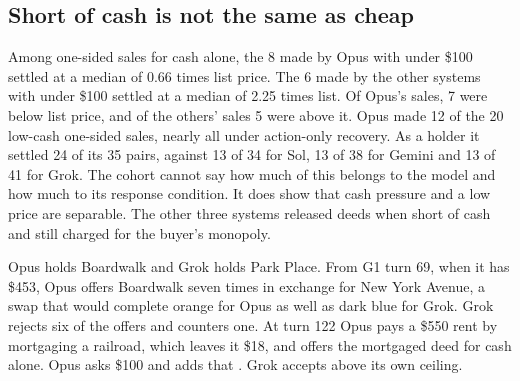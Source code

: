 \subsection{Short of cash is not the same as cheap}

Among one-sided sales for cash alone, the 8 made by Opus with under \$100 settled at a median of 0.66 times list price. The 6 made by the other systems with under \$100 settled at a median of 2.25 times list. Of Opus's sales, 7 were below list price, and of the others' sales 5 were above it. Opus made 12 of the 20 low-cash one-sided sales, nearly all under action-only recovery. As a holder it settled 24 of its 35 pairs, against 13 of 34 for Sol, 13 of 38 for Gemini and 13 of 41 for Grok. The cohort cannot say how much of this belongs to the model and how much to its response condition. It does show that cash pressure and a low price are separable. The other three systems released deeds when short of cash and still charged for the buyer's monopoly.


Opus holds Boardwalk and Grok holds Park Place. From G1 turn 69, when it has \$453, Opus offers Boardwalk seven times in exchange for New York Avenue, a swap that would complete orange for Opus as well as dark blue for Grok. Grok rejects six of the offers and counters one. At turn 122 Opus pays a \$550 rent by mortgaging a railroad, which leaves it \$18, and offers the mortgaged deed for cash alone.
Opus asks \$100 and adds that . Grok accepts above its own ceiling.

